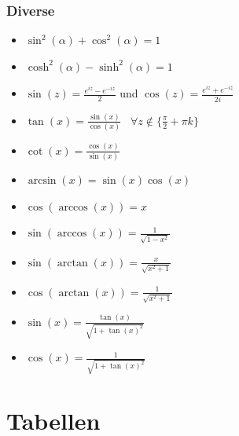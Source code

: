 \documentclass[8pt]{extarticle}
\begin{document}
\begin{multicols*}{3}
\subsubsection{Diverse}

\begin{itemize}
 \item $\sin^2(\alpha) + \cos^2(\alpha) = 1$
 \item $\cosh^2(\alpha) - \sinh^2(\alpha) = 1$
 \item $\sin(z) = \frac{e^{iz} - e^{-iz}}{2}$ und $\cos(z) = \frac{e^{iz} + e^{-iz}}{2i}$
 \item $\tan(x) = \frac{\sin(x)}{\cos(x)} \;\;\; \forall z \not \in \{\frac{\pi}{2} + \pi k\}$
 \item $\cot(x) = \frac{\cos(x)}{\sin(x)}$
 \item $\arcsin(x) = \sin(x)\cos(x)$
 \item $\cos(\arccos(x)) = x$
 \item $\sin(\arccos(x)) = \frac{1}{\sqrt{1 - x^2}}$
 \item $\sin(\arctan(x)) = \frac{x}{\sqrt{x^2 + 1}}$
 \item $\cos(\arctan(x)) = \frac{1}{\sqrt{x^2 + 1}}$
 \item $\sin(x) = \frac{\tan(x)}{\sqrt{1 + \tan(x)^2}}$
 \item $\cos(x) = \frac{1}{\sqrt{1 + \tan(x)^2}}$

\end{itemize}

\section{Tabellen}

\end{multicols*}
\end{document}
